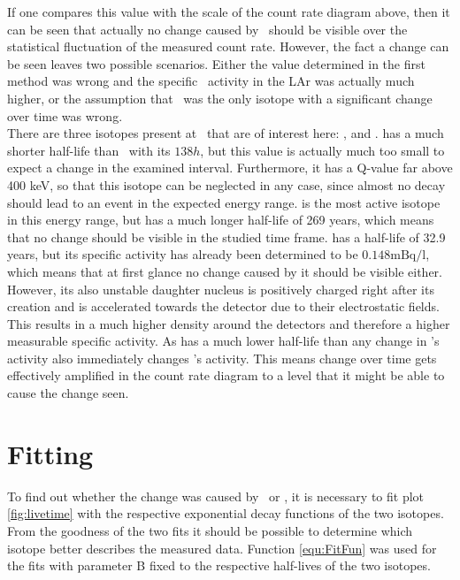\documentclass[encoding=utf8,british]{tumphthesis}
\begin{document}
If one compares this value with the scale of the count rate diagram above, then it can be seen that actually no change caused by \Kr\  should be visible over the statistical fluctuation of the measured count rate.
However, the fact a change can be seen leaves two possible scenarios.
Either the value determined in the first method was wrong and the specific \Kr\ activity in the LAr was actually much higher, or the assumption that \Kr\ was the only isotope with a significant change over time was wrong.
\\

There are three isotopes present at \gerda\ that are of interest here: ,  and .
 has a much shorter half-life than \Kr\ with its $138 h$, but this value is actually much too small to expect a change in the examined interval. 
Furthermore, it has a Q-value far above 400 keV, so that this isotope can be neglected in any case, since almost no decay should lead to an event in the expected energy range. 
 is the most active isotope in this energy range, but has a much longer half-life of 269 years, which means that no change should be visible in the studied time frame.
 has a half-life of 32.9 years, but its specific activity has already been determined to be $0.148\mathrm{mBq/l}$, which means that at first glance no change caused by it should be visible either.
However, its also unstable daughter nucleus  is positively charged right after its creation and is accelerated towards the detector due to their electrostatic fields.
This results in a much higher  density around the detectors and therefore a higher measurable specific activity.
As  has a much lower half-life than  any change in 's activity also immediately changes 's activity.
This means  change over time gets effectively amplified in the count rate diagram to a level that it might be able to cause the change seen.
\\

\section{Fitting}

To find out whether the change was caused by \Kr\ or , it is necessary to fit  plot \ref{fig:livetime} with the respective exponential decay functions of the two isotopes.
From the goodness of the two fits it should be possible to determine which isotope better describes the measured data.
Function \ref{equ:FitFun} was used for the fits  with parameter B fixed to the respective half-lives of the two isotopes.
\end{document}
